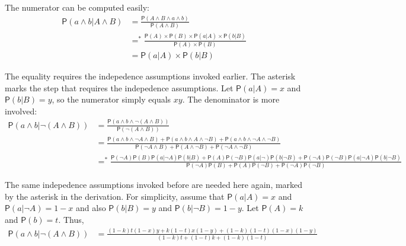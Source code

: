 \documentclass[10pt,dvipsnames,enabledeprecatedfontcommands]{scrartcl}
\newcommand{\et}{\wedge}
\newcommand{\pr}[1]{\mathsf{P}(#1)}
\begin{document}
The numerator can be computed
easily:
\begin{align*}
\pr{a \wedge b| A\wedge B} & =  \frac{\pr{A \et B \et a\et b}}{\pr{A \et B}}\\
& =^* \frac{\pr{A} \times \pr{B} \times \pr{a | A} \times \pr{b | B}}{\pr{A}  \times \pr{B}} \\
& = \pr{a | A} \times \pr{b | B} 
 \end{align*}

\noindent The equality requires the indepedence assumptions invoked
earlier. The asterisk marks the step that requires the indepedence
assumptions.
Let \(\pr{a |A}=x\) and \(\pr{b |B}=y\), so the numerator simply equals
\(xy\). The denominator is more involved: \begin{align*}
\pr{a \et b| \neg (A\et B)} & = \frac{\pr{a \et b \et \neg (A\et B)}}{\pr{\neg (A \et B)}} \\
& = \frac{\pr{a \et b \et \neg A\et B} +  \pr{a \et b \et A\et \neg B} + \pr{a \et b \et \neg A\et \neg B}  }{\pr{\neg A \et B} + \pr{A \et \neg B} + \pr{\neg A \et \neg B} } \\
& =^* \frac{\pr{\neg A}\pr{B} \pr{a | \neg A}\pr{b | B} + \pr{A}\pr{\neg B} \pr{a | \neg }\pr{b | \neg B} + \pr{\neg A}\pr{\neg B} \pr{a | \neg A}\pr{b | \neg B}}{\pr{\neg A}\pr{B} + \pr{A}\pr{\neg B} + \pr{\neg A}\pr{\neg B} }  
 \end{align*}

\noindent  The same indepedence assumptions invoked before are needed
here again,
marked by the asterisk in the derivation. For simplicity,
assume that \(\pr{a |A}=x\) and \(\pr{a |\neg A}=1-x\)
and also \(\pr{b |B}=y\) and \(\pr{b | \neg B}=1-y\). Let \(\pr{A}=k\)
and \(\pr{b}=t\). Thus, \begin{align*}
\pr{a \et b| \neg (A\et B)} & = \frac{(1-k)t(1-x)y + k(1-t)x(1-y) + (1-k)(1-t)(1-x)(1-y)}{ \left(1-k\right) t +\left(1-t\right) k+\left(1-k\right) \left(1-t\right) }
 \end{align*}
\end{document}
